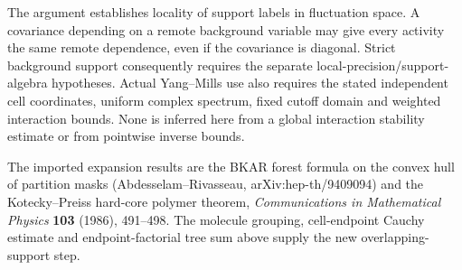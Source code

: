 The argument establishes locality of support labels in fluctuation
space. A covariance depending on a remote background variable may
give every activity the same remote dependence, even if the
covariance is diagonal. Strict background support consequently
requires the separate local-precision/support-algebra hypotheses.
Actual Yang--Mills use also requires the stated independent cell
coordinates, uniform complex spectrum, fixed cutoff domain and
weighted interaction bounds. None is inferred here from a global
interaction stability estimate or from pointwise inverse bounds.

The imported expansion results are the BKAR forest formula on the
convex hull of partition masks (Abdesselam--Rivasseau,
arXiv:hep-th/9409094) and the Kotecky--Preiss hard-core polymer
theorem, \emph{Communications in Mathematical Physics} \textbf{103}
(1986), 491--498. The molecule grouping, cell-endpoint Cauchy
estimate and endpoint-factorial tree sum above supply the new
overlapping-support step.
